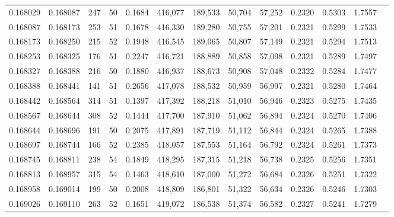 \begin{tabular}{rrrrrrrrrrrrr}
0.168029 & 0.168087 &   247 &  50 &                                     0.1684 & 416,077 & 189,533 &  50,704 &  57,252 & 0.2320 & 0.5303 & 1.7557 \\
0.168087 & 0.168173 &   253 &  51 &                                     0.1678 & 416,330 & 189,280 &  50,755 &  57,201 & 0.2321 & 0.5299 & 1.7533 \\
0.168173 & 0.168250 &   215 &  52 &                                     0.1948 & 416,545 & 189,065 &  50,807 &  57,149 & 0.2321 & 0.5294 & 1.7513 \\
0.168253 & 0.168325 &   176 &  51 &                                     0.2247 & 416,721 & 188,889 &  50,858 &  57,098 & 0.2321 & 0.5289 & 1.7497 \\
0.168327 & 0.168388 &   216 &  50 &                                     0.1880 & 416,937 & 188,673 &  50,908 &  57,048 & 0.2322 & 0.5284 & 1.7477 \\
0.168388 & 0.168441 &   141 &  51 &                                     0.2656 & 417,078 & 188,532 &  50,959 &  56,997 & 0.2321 & 0.5280 & 1.7464 \\
0.168442 & 0.168564 &   314 &  51 &                                     0.1397 & 417,392 & 188,218 &  51,010 &  56,946 & 0.2323 & 0.5275 & 1.7435 \\
0.168567 & 0.168644 &   308 &  52 &                                     0.1444 & 417,700 & 187,910 &  51,062 &  56,894 & 0.2324 & 0.5270 & 1.7406 \\
0.168644 & 0.168696 &   191 &  50 &                                     0.2075 & 417,891 & 187,719 &  51,112 &  56,844 & 0.2324 & 0.5265 & 1.7388 \\
0.168697 & 0.168744 &   166 &  52 &                                     0.2385 & 418,057 & 187,553 &  51,164 &  56,792 & 0.2324 & 0.5261 & 1.7373 \\
0.168745 & 0.168811 &   238 &  54 &                                     0.1849 & 418,295 & 187,315 &  51,218 &  56,738 & 0.2325 & 0.5256 & 1.7351 \\
0.168813 & 0.168957 &   315 &  54 &                                     0.1463 & 418,610 & 187,000 &  51,272 &  56,684 & 0.2326 & 0.5251 & 1.7322 \\
0.168958 & 0.169014 &   199 &  50 &                                     0.2008 & 418,809 & 186,801 &  51,322 &  56,634 & 0.2326 & 0.5246 & 1.7303 \\
0.169026 & 0.169110 &   263 &  52 &                                     0.1651 & 419,072 & 186,538 &  51,374 &  56,582 & 0.2327 & 0.5241 & 1.7279 \\

\end{tabular}
